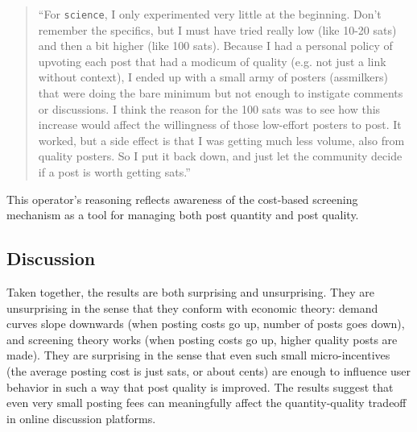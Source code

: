 \begin{quote}
``For \texttt{science}, I only experimented very little at the beginning. Don't remember the specifics, but I must have tried really low (like 10-20 sats) and then a bit higher (like 100 sats). Because I had a personal policy of upvoting each post that had a modicum of quality (e.g. not just a link without context), I ended up with a small army of posters (assmilkers) that were doing the bare minimum but not enough to instigate comments or discussions. I think the reason for the 100 sats was to see how this increase would affect the willingness of those low-effort posters to post. It worked, but a side effect is that I was getting much less volume, also from quality posters. So I put it back down, and just let the community decide if a post is worth getting sats.''
\end{quote}

\noindent This operator's reasoning reflects awareness of the cost-based screening mechanism as a tool for managing both post quantity and post quality.



\subsection{Discussion}

Taken together, the results are both surprising and unsurprising. They are unsurprising in the sense that they conform with economic theory: demand curves slope downwards (when posting costs go up, number of posts goes down), and screening theory works (when posting costs go up, higher quality posts are made). They are surprising in the sense that even such small micro-incentives (the average posting cost is just  sats, or about  cents) are enough to influence user behavior in such a way that post quality is improved. The results suggest that even very small posting fees can meaningfully affect the quantity-quality tradeoff in online discussion platforms.  




